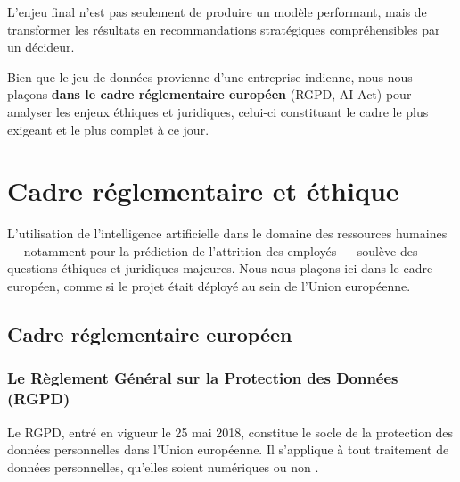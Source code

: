 \documentclass[12pt,a4paper]{article}
\begin{document}
L'enjeu final n'est pas seulement de produire un modèle performant, mais de transformer les résultats en recommandations stratégiques compréhensibles par un décideur.

Bien que le jeu de données provienne d'une entreprise indienne, nous nous plaçons \textbf{dans le cadre réglementaire européen} (RGPD, AI Act) pour analyser les enjeux éthiques et juridiques, celui-ci constituant le cadre le plus exigeant et le plus complet à ce jour.

\section{Cadre réglementaire et éthique}

L'utilisation de l'intelligence artificielle dans le domaine des ressources humaines --- notamment pour la prédiction de l'attrition des employés --- soulève des questions éthiques et juridiques majeures. Nous nous plaçons ici dans le cadre européen, comme si le projet était déployé au sein de l'Union européenne.

\subsection{Cadre réglementaire européen}

\subsubsection{Le Règlement Général sur la Protection des Données (RGPD)}

Le RGPD, entré en vigueur le 25 mai 2018, constitue le socle de la protection des données personnelles dans l'Union européenne. Il s'applique à tout traitement de données personnelles, qu'elles soient numériques ou non \cite{rgpd_officiel, cnil_rgpd}.
\end{document}
